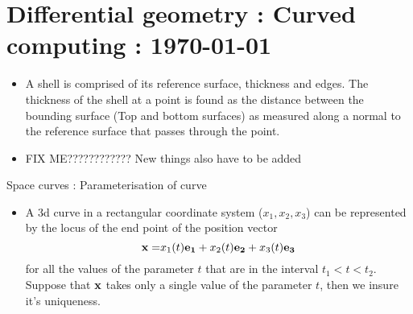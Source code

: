 




\tableofcontents	

\section{Differential geometry : Curved computing : \today}


	\begin{frame}
		\begin{itemize}
			\item A shell is comprised of its reference surface, thickness and edges. The thickness of the shell at a point is found as the distance between the bounding surface (Top and bottom surfaces) as measured along a normal to the reference surface that passes through the point.  
			\item FIX ME???????????? New things also have to be added
		\end{itemize}
	\end{frame}


	\begin{frame}{Space curves : Parameterisation of curve}
		\begin{itemize}
			\item A 3d curve in a rectangular coordinate system ($x_1,x_2,x_3$) can be represented by the locus of the end point of the position vector
			\begin{equation}
				\mathbf{x =} x_1(t)\mathbf{e_1} + x_2(t)\mathbf{e_2} + x_3(t)\mathbf{e_3} 
			\end{equation}
			for all the values of the parameter $t$ that are in the interval $t_1<t<t_2$. Suppose that $\mathbf{x}$ takes only  a single value of the parameter $t$, then we insure it's uniqueness. 
		\end{itemize}
	\end{frame}


